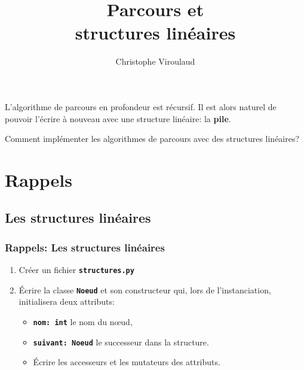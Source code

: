 \documentclass[svgnames,11pt]{beamer}
\author[]{Christophe Viroulaud}
\title{Parcours et\\structures linéaires}
\date{\framebox{\textbf{Algo 21}}}
\institute{Terminale - NSI}
\begin{document}
\begin{frame}
\titlepage
\end{frame}
\begin{frame}
    \frametitle{}

    L'algorithme de parcours en profondeur est récursif. Il est alors naturel de pouvoir l'écrire à nouveau avec une structure linéaire: la \textbf{pile}.
    \begin{framed}
        Comment implémenter les algorithmes de parcours avec des structures linéaires?
    \end{framed}

\end{frame}
\section{Rappels}
\subsection{Les structures linéaires}
\begin{frame}
    \frametitle{Rappels: Les structures linéaires}
    \begin{center}
    

    \end{center}
    \begin{activite}
    \begin{enumerate}
        \item Créer un fichier \textbf{\texttt{structures.py}}
        \item Écrire la classe \textbf{\texttt{Noeud}} et son constructeur qui, lors de l'instanciation, initialisera deux attributs:
        \begin{itemize}
            \item \textbf{\texttt{nom: int}} le nom du nœud,
            \item \textbf{\texttt{suivant: Noeud}} le successeur dans la structure.
            \item Écrire les accesseurs et les mutateurs des attributs. 
        \end{itemize}
    \end{enumerate}
    \end{activite}

\end{frame}
\end{document}
